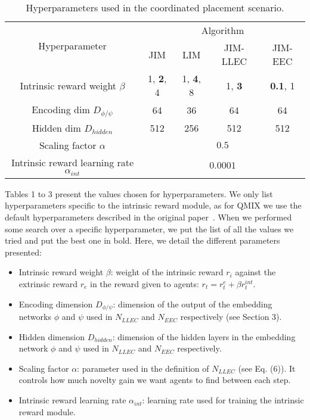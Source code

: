 \begin{table}[h]
    \centering
    \caption{Hyperparameters used in the coordinated placement scenario.}
    \begin{tabular}{ccccc}
        \hline
        \multirow{2}{*}{Hyperparameter}               & \multicolumn{4}{c}{Algorithm}                                                                        \\ \cline{2-5} 
                                                      & \multicolumn{1}{c}{JIM}     & \multicolumn{1}{c}{LIM}     & \multicolumn{1}{c}{JIM-LLEC} & JIM-EEC \\ \hline
        Intrinsic reward weight $\beta$               & \multicolumn{1}{c}{1, \textbf{2}, 4} & \multicolumn{1}{c}{1, \textbf{4}, 8} & \multicolumn{1}{c}{1, \textbf{3}}     & \textbf{0.1}, 1  \\ 
        Encoding dim $D_{\phi/\psi}$                  & \multicolumn{1}{c}{64}      & \multicolumn{1}{c}{36}      & \multicolumn{1}{c}{64}       & 64      \\ 
        Hidden dim $D_{hidden}$                       & \multicolumn{1}{c}{512}     & \multicolumn{1}{c}{256}     & \multicolumn{1}{c}{512}      & 512     \\ 
        Scaling factor $\alpha$                       & \multicolumn{4}{c}{$0.5$}                                                                            \\ 
        Intrinsic reward learning rate $\alpha_{int}$ & \multicolumn{4}{c}{$0.0001$}                                                                         \\ \hline
    \end{tabular}
\end{table}

Tables 1 to 3 present the values chosen for hyperparameters. We only list hyperparameters specific to the intrinsic reward module, as for QMIX we use the default hyperparameters described in the original paper~\citep{Rashid2018_QMIX}. When we performed some search over a specific hyperparameter, we put the list of all the values we tried and put the best one in bold. Here, we detail the different parameters presented:
\begin{itemize}
    \item Intrinsic reward weight $\beta$: weight of the intrinsic reward $r_i$ against the extrinsic reward $r_e$ in the reward given to agents: $r_t=r^e_t+\beta r^{int}_t$. 
    \item Encoding dimension $D_{\phi/\psi}$: dimension of the output of the embedding networks $\phi$ and $\psi$ used in $N_{LLEC}$ and $N_{EEC}$ respectively (see Section 3).
    \item Hidden dimension $D_{hidden}$: dimension of the hidden layers in the embedding network $\phi$ and $\psi$ used in $N_{LLEC}$ and $N_{EEC}$ respectively.
    \item Scaling factor $\alpha$: parameter used in the definition of $N_{LLEC}$ (see Eq. (6)). It controls how much novelty gain we want agents to find between each step.
    \item Intrinsic reward learning rate $\alpha_{int}$: learning rate used for training the intrinsic reward module.
\end{itemize}